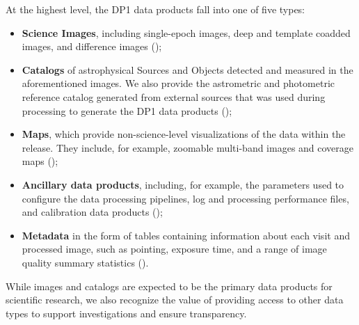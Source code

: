 At the highest level, the \gls{DP1} data products fall into one of five types:
\begin{itemize}
\item \textbf{Science Images}, including single-\gls{epoch} images, deep and template coadded images, and difference images ();
\item \textbf{Catalogs} of astrophysical Sources and Objects detected and measured in the aforementioned images. We also provide the astrometric and photometric reference catalog generated from external sources that was used during processing to generate the \gls{DP1} data products ();
\item \textbf{Maps}, which provide non-science-level visualizations of the data within the release. They include, for example, zoomable multi-band images and coverage maps ();
\item \textbf{Ancillary data products}, including, for example, the parameters used to configure the data processing pipelines, log and processing performance files,  and \gls{calibration} data products ();
\item \textbf{Metadata} in the form of tables containing information about each visit and processed image, such as pointing, exposure time, and a range of image quality summary statistics ().
\end{itemize}
While images and catalogs are expected to be the primary data products for scientific research, we also recognize the value of providing access to other data types to support investigations and ensure transparency.

